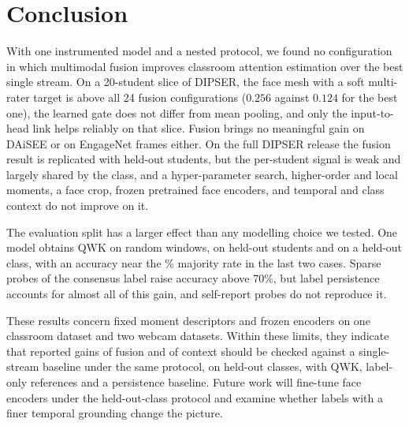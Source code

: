 \section{Conclusion}
\label{sec:conclusion}

With one instrumented model and a nested protocol, we found no configuration in which multimodal fusion improves classroom attention estimation over the best single stream. On a 20-student slice of DIPSER, the face mesh with a soft multi-rater target is above all 24 fusion configurations ($0.256$ against $0.124$ for the best one), the learned gate does not differ from mean pooling, and only the input-to-head link helps reliably on that slice. Fusion brings no meaningful gain on DAiSEE or on EngageNet frames either. On the full DIPSER release the fusion result is replicated with held-out students, but the per-student signal is weak and largely shared by the class, and a hyper-parameter search, higher-order and local moments, a face crop, frozen pretrained face encoders, and temporal and class context do not improve on it.

The evaluation split has a larger effect than any modelling choice we tested. One model obtains QWK \fcLeakRandQWK{} on random windows, \fcLeakPersonQWK{} on held-out students and \fcLogoOwnQWK{} on a held-out class, with an accuracy near the \fcMajority\% majority rate in the last two cases. Sparse probes of the consensus label raise accuracy above 70\%, but label persistence accounts for almost all of this gain, and self-report probes do not reproduce it.

These results concern fixed moment descriptors and frozen encoders on one classroom dataset and two webcam datasets. Within these limits, they indicate that reported gains of fusion and of context should be checked against a single-stream baseline under the same protocol, on held-out classes, with QWK, label-only references and a persistence baseline. Future work will fine-tune face encoders under the held-out-class protocol and examine whether labels with a finer temporal grounding change the picture.
